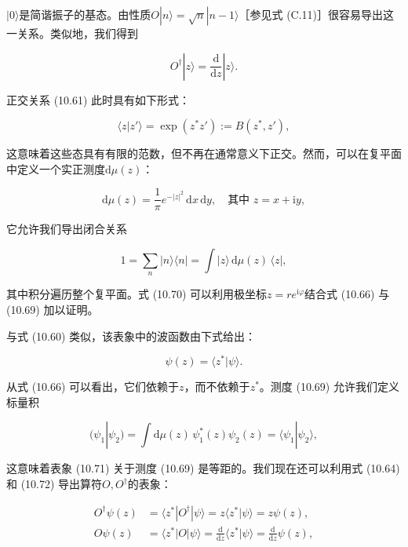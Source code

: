 $|0\rangle$是简谐振子的基态。由性质$O|n\rangle=\sqrt{n}|n-1\rangle$［参见式 (C.11)］很容易导出这一关系。类似地，我们得到

\begin{equation}
O^{\dagger}|z\rangle=\frac{\mathrm{d}}{\mathrm{d}z}|z\rangle.\label{eq:10.67}
\end{equation}

正交关系 (10.61) 此时具有如下形式：

\begin{equation}
\langle z|z'\rangle=\exp(z^{*}z'):=B(z^{*},z'),\label{eq:10.68}
\end{equation}

这意味着这些态具有有限的范数，但不再在通常意义下正交。然而，可以在复平面中定义一个实正测度$\mathrm{d}\mu(z)$：

\begin{equation}
\mathrm{d}\mu(z)=\frac{1}{\pi}e^{-|z|^{2}}\,\mathrm{d}x\,\mathrm{d}y,\quad\text{其中 }z=x+\mathrm{i}y,\label{eq:10.69}
\end{equation}

它允许我们导出闭合关系

\begin{equation}
1=\sum_{n}|n\rangle\langle n|=\int|z\rangle\,\mathrm{d}\mu(z)\,\langle z|,\label{eq:10.70}
\end{equation}

其中积分遍历整个复平面。式 (10.70) 可以利用极坐标$z=re^{\mathrm{i}\varphi}$结合式 (10.66)
与 (10.69) 加以证明。

与式 (10.60) 类似，该表象中的波函数由下式给出：

\begin{equation}
\psi(z)=\langle z^{*}|\psi\rangle.\label{eq:10.71}
\end{equation}

从式 (10.66) 可以看出，它们依赖于$z$，而不依赖于$z^{*}$。测度 (10.69) 允许我们定义标量积

\begin{equation}
(\psi_{1}|\psi_{2})=\int\mathrm{d}\mu(z)\,\psi^{*}_{1}(z)\psi_{2}(z)=\langle\psi_{1}|\psi_{2}\rangle,\label{eq:10.72}
\end{equation}

这意味着表象 (10.71) 关于测度 (10.69) 是等距的。我们现在还可以利用式 (10.64) 和 (10.72) 导出算符$O,O^{\dagger}$的表象：

\begin{align}
O^{\dagger}\psi(z) & =\langle z^{*}|O^{\dagger}|\psi\rangle=z\langle z^{*}|\psi\rangle=z\psi(z),\nonumber \\
O\psi(z) & =\langle z^{*}|O|\psi\rangle=\frac{\mathrm{d}}{\mathrm{d}z}\langle z^{*}|\psi\rangle=\frac{\mathrm{d}}{\mathrm{d}z}\psi(z),\label{eq:10.73}
\end{align}

